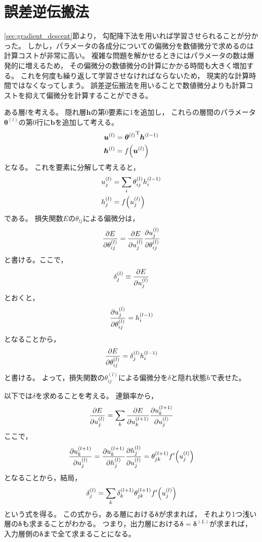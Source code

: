 \documentclass[class=jsarticle, crop=false, dvipdfmx, fleqn]{standalone}
\begin{document}
\section{誤差逆伝搬法}

\ref{sec:gradient_descent}節より，
勾配降下法を用いれば学習させられることが分かった。
しかし，パラメータの各成分についての偏微分を数値微分で求めるのは計算コストが非常に高い。
複雑な問題を解かせるときにはパラメータの数は爆発的に増えるため，
その偏微分の数値微分の計算にかかる時間も大きく増加する。
これを何度も繰り返して学習させなければならないため，
現実的な計算時間ではなくなってしまう。
誤差逆伝搬法を用いることで数値微分よりも計算コストを抑えて偏微分を計算することができる。

ある層$l$を考える。
隠れ層$\bm{h}$の第0要素に1を追加し，
これらの層間のパラメータ$\bm{\theta}^{(l)}$の第0行に$\bm{b}$を追加して考える。
\begin{align}
& \bm{u}^{(l)} = {\bm{\theta}^{(l)}}^{\mathrm{T}} \bm{h}^{(l-1)} \\
& \bm{h}^{(l)} = f\qty(\bm{u}^{(l)})
\end{align}
となる。
これを要素に分解して考えると，
\begin{align}
& u_j^{(l)} = \sum_i \theta_{ij}^{(l)} h_i^{(l-1)} \\
& h_j^{(l)} = f\qty(u_j^{(l)})
\end{align}
である。
損失関数$E$の$\theta_{ij}$による偏微分は，
\begin{equation}
\pdv{E}{\theta_{ij}^{(l)}} = \pdv{E}{u_j^{(l)}} \pdv{u_j^{(l)}}{\theta_{ij}^{(l)}}
\end{equation}
と書ける。ここで，
\begin{equation}
\delta_j^{(l)} \equiv \pdv{E}{u_j^{(l)}}
\label{eq:def:delta}
\end{equation}
とおくと，
\begin{equation}
\pdv{u_j^{(l)}}{\theta_{ij}^{(l)}} = h_i^{(l-1)}
\end{equation}
となることから，
\begin{equation}
\pdv{E}{\theta_{ij}^{(l)}} = \delta_j^{(l)} h_i^{(l-1)}
\label{eq:pdv_param}
\end{equation}
と書ける。
よって，損失関数の$\theta_{ij}^{(l)}$による偏微分を$\delta$と隠れ状態$h$で表せた。

以下では$\delta$を求めることを考える。
連鎖率から，
\begin{equation}
\pdv{E}{u_j^{(l)}} = \sum_k \pdv{E}{u_k^{(l+1)}} \pdv{u_k^{(l+1)}}{u_{j}^{(l)}}
\end{equation}
ここで，
\begin{equation}
\pdv{u_k^{(l+1)}}{u_{j}^{(l)}}
	= \pdv{u_k^{(l+1)}}{h_{j}^{(l)}} \pdv{h_j^{(l)}}{u_{j}^{(l)}}
	= \theta_{jk}^{(l+1)} f^\prime \qty(u_{j}^{(l)})
\end{equation}
となることから，結局，
\begin{equation}
\delta_j^{(l)} = \sum_k \delta_k^{(l+1)} \theta_{jk}^{(l+1)} f^\prime \qty(u_{j}^{(l)})
\label{eq:backprop_delta}
\end{equation}
という式を得る。
この式から，ある層における$\bm{\delta}$が求まれば，
それより1つ浅い層の$\bm{\delta}$も求まることがわかる。
つまり，出力層における$\bm{\delta} = \bm{\delta}^{(L)}$が求まれば，
入力層側の$\bm{\delta}$まで全て求まることになる。
\end{document}
